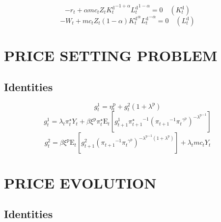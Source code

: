 \begin{equation}
-r_{t} + {\alpha} {{m\!c}_{t}} {Z_{t}} {{K^{\mathrm{d}}_{t}}^{-1 + \alpha}} {{L^{\mathrm{d}}_{t}}^{1 - \alpha}} = 0
 \quad \left(K^{\mathrm{d}}_{t}\right)
\end{equation}
\begin{equation}
-W_{t} + {{m\!c}_{t}} {Z_{t}} \left(1 - \alpha\right) {{K^{\mathrm{d}}_{t}}^{\alpha}} {{L^{\mathrm{d}}_{t}}^{-\alpha}} = 0
 \quad \left(L^{\mathrm{d}}_{t}\right)
\end{equation}




\section{PRICE SETTING PROBLEM}

\subsection{Identities}

\begin{equation}
g^{\mathrm{1}}_{t} = \eta^{\mathrm{p}}_{t} + {g^{\mathrm{2}}_{t}} \left(1 + \lambda^{\mathrm{p}}\right)
\end{equation}
\begin{equation}
g^{\mathrm{1}}_{t} = {\lambda_{t}} {\pi^{\star}_{t}} {Y_{t}} + {\beta} {\xi^{\mathrm{p}}} {\pi^{\star}_{t}} {\mathrm{E}_{t}\left[{g^{\mathrm{1}}_{t+1}} {\pi^{\star}_{t+1}}^{-1} {\left({\pi_{t+1}}^{-1} {{\pi_{t}}^{\gamma^{\mathrm{p}}}}\right)^{-{\lambda^{\mathrm{p}}}^{-1}}}\right]}
\end{equation}
\begin{equation}
g^{\mathrm{2}}_{t} = {\beta} {\xi^{\mathrm{p}}} {\mathrm{E}_{t}\left[{g^{\mathrm{2}}_{t+1}} {\left({\pi_{t+1}}^{-1} {{\pi_{t}}^{\gamma^{\mathrm{p}}}}\right)^{-{\lambda^{\mathrm{p}}}^{-1} \left(1 + \lambda^{\mathrm{p}}\right)}}\right]} + {\lambda_{t}} {{m\!c}_{t}} {Y_{t}}
\end{equation}




\section{PRICE EVOLUTION}

\subsection{Identities}

